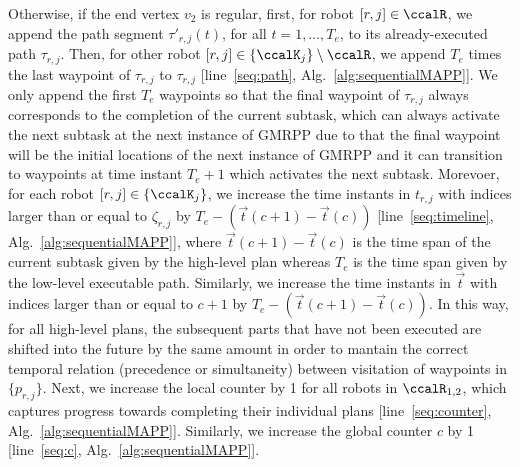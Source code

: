\documentclass[Afour,sageh,times]{sagej}
\begin{document}
{{Otherwise, if the end vertex $v_2$ is regular, first, for robot $[r, j] \in \ccalR$, we append the path segment $\tau'_{r,j}(t)$, for all $t=1,\ldots, T_e$, to its already-executed path $\tau_{r,j}$. Then, for other robot $[r,j] \in \{\ccalK_j\}\setminus \ccalR$, we  append  $T_e$ times the last waypoint of  $\tau_{r,j}$  to $\tau_{r,j}$ [line~\ref{seq:path}, Alg.~\ref{alg:sequentialMAPP}]. We only append the first $T_e$ waypoints so that the final waypoint of $\tau_{r,j}$ always corresponds to the completion of the current  subtask, which can always activate the next subtask at the next instance of GMRPP due to that the final waypoint will be the initial locations of the next instance of GMRPP and it  can transition to waypoints at time instant $T_e+1$ which activates the next subtask.  Morevoer, for each robot $[r,j] \in \{\ccalK_j\}$, we increase the time instants in $t_{r,j}$ with indices larger than or equal to  $\zeta_{r,j}$ by $T_e - (\vec{t}(c+1) - \vec{t}(c))$ [line~\ref{seq:timeline}, Alg.~\ref{alg:sequentialMAPP}], where $\vec{t}(c+1) - \vec{t}(c)$ is the time span of the current subtask  given by the high-level plan whereas $T_e$ is the time span given by the low-level executable path.
    Similarly, we increase the time instants in $\vec{t}$ with indices larger than or equal to  $c+1$ by $T_e - (\vec{t}(c+1)- \vec{t}(c))$.
    In this way, for all high-level plans, the subsequent parts that have not been executed are shifted into the future by the same amount in order to mantain the correct temporal relation (precedence or simultaneity) between visitation of waypoints in $\{p_{r,j}\}$. Next, we increase  the local counter by 1 for all robots in $\ccalR_{1,2}$, which captures progress towards completing their individual plans [line~\ref{seq:counter}, Alg.~\ref{alg:sequentialMAPP}]. Similarly, we increase the global counter $c$ by 1 [line~\ref{seq:c}, Alg.~\ref{alg:sequentialMAPP}].}


}
\end{document}
